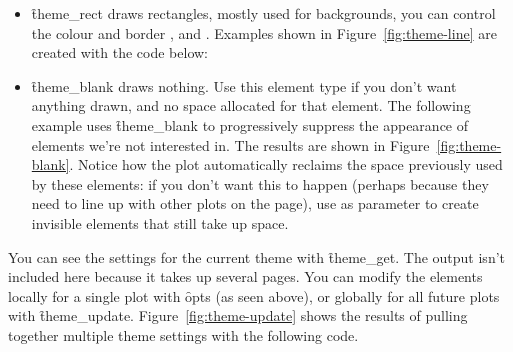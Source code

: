 \begin{itemize}
  \item \f{theme_rect} draws rectangles, mostly used for backgrounds, you can control the  colour and border ,  and .  Examples shown in Figure~\ref{fig:theme-line} are created with the code below:
  
    

  \item \f{theme_blank} draws nothing.  Use this element type if you don't want anything drawn, and no space allocated for that element.  The following example uses \f{theme_blank} to progressively suppress the appearance of elements we're not interested in. The results are shown in Figure~\ref{fig:theme-blank}.  Notice how the plot automatically reclaims the space previously used by these elements: if you don't want this to happen (perhaps because they need to line up with other plots on the page), use  as parameter to create invisible elements that still take up space.

    

\end{itemize}

You can see the settings for the current theme with \f{theme_get}.  The output isn't included here because it takes up several pages.  You can modify the elements locally for a single plot with \f{opts} (as seen above), or globally for all future plots with \f{theme_update}.  Figure~\ref{fig:theme-update} shows the results of pulling together multiple theme settings with the following code.


